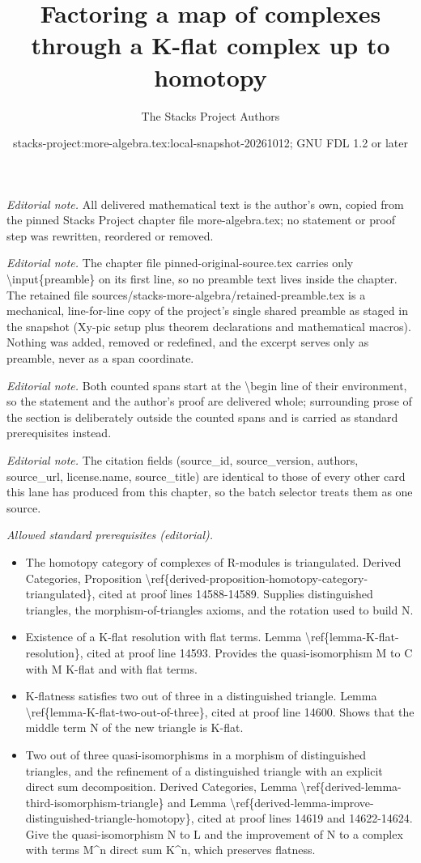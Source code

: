 \documentclass[10pt,a4paper]{amsart}
\title{Factoring a map of complexes through a K-flat complex up to homotopy}
\author{The Stacks Project Authors}
\date{stacks-project:more-algebra.tex:local-snapshot-20261012; GNU FDL 1.2 or later}
\theoremstyle{plain}
\theoremstyle{definition}
\theoremstyle{remark}
\numberwithin{equation}{subsection}
\begin{document}
\maketitle
\setcounter{subsection}{1}
\noindent\textit{Editorial note.} All delivered mathematical text is the author's own, copied from the pinned Stacks Project chapter file more-algebra.tex; no statement or proof step was rewritten, reordered or removed.\par\medskip
\noindent\textit{Editorial note.} The chapter file pinned-original-source.tex carries only \textbackslash{}input\{preamble\} on its first line, so no preamble text lives inside the chapter. The retained file sources/stacks-more-algebra/retained-preamble.tex is a mechanical, line-for-line copy of the project's single shared preamble as staged in the snapshot (Xy-pic setup plus theorem declarations and mathematical macros). Nothing was added, removed or redefined, and the excerpt serves only as preamble, never as a span coordinate.\par\medskip
\noindent\textit{Editorial note.} Both counted spans start at the \textbackslash{}begin line of their environment, so the statement and the author's proof are delivered whole; surrounding prose of the section is deliberately outside the counted spans and is carried as standard prerequisites instead.\par\medskip
\noindent\textit{Editorial note.} The citation fields (source\_id, source\_version, authors, source\_url, license.name, source\_title) are identical to those of every other card this lane has produced from this chapter, so the batch selector treats them as one source.\par\medskip
\noindent\textit{Allowed standard prerequisites (editorial).}\begin{itemize}
\item The homotopy category of complexes of R-modules is triangulated. Derived Categories, Proposition \textbackslash{}ref\{derived-proposition-homotopy-category-triangulated\}, cited at proof lines 14588-14589. Supplies distinguished triangles, the morphism-of-triangles axioms, and the rotation used to build N.
\item Existence of a K-flat resolution with flat terms. Lemma \textbackslash{}ref\{lemma-K-flat-resolution\}, cited at proof line 14593. Provides the quasi-isomorphism M to C with M K-flat and with flat terms.
\item K-flatness satisfies two out of three in a distinguished triangle. Lemma \textbackslash{}ref\{lemma-K-flat-two-out-of-three\}, cited at proof line 14600. Shows that the middle term N of the new triangle is K-flat.
\item Two out of three quasi-isomorphisms in a morphism of distinguished triangles, and the refinement of a distinguished triangle with an explicit direct sum decomposition. Derived Categories, Lemma \textbackslash{}ref\{derived-lemma-third-isomorphism-triangle\} and Lemma \textbackslash{}ref\{derived-lemma-improve-distinguished-triangle-homotopy\}, cited at proof lines 14619 and 14622-14624. Give the quasi-isomorphism N to L and the improvement of N to a complex with terms M\textasciicircum{}n direct sum K\textasciicircum{}n, which preserves flatness.
\end{itemize}\medskip
\end{document}
